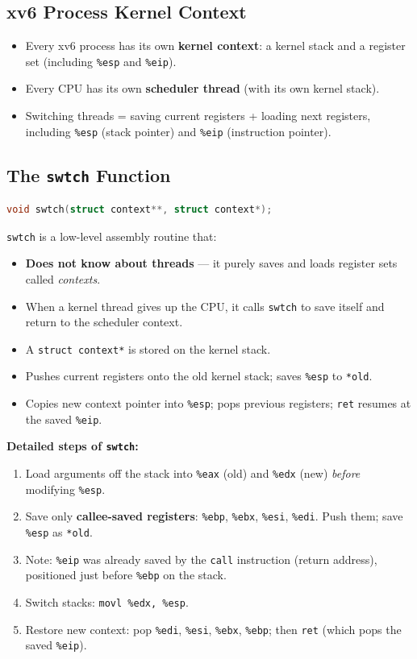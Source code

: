 \documentclass[11pt]{article}
\begin{document}
\subsection{xv6 Process Kernel Context}

\begin{itemize}
    \item Every xv6 process has its own \textbf{kernel context}: a kernel stack and a register set (including \texttt{\%esp} and \texttt{\%eip}).
    \item Every CPU has its own \textbf{scheduler thread} (with its own kernel stack).
    \item Switching threads = saving current registers + loading next registers, including \texttt{\%esp} (stack pointer) and \texttt{\%eip} (instruction pointer).
\end{itemize}

\subsection{The \texttt{swtch} Function}

\begin{lstlisting}[language=C]
void swtch(struct context**, struct context*);
\end{lstlisting}

\texttt{swtch} is a low-level assembly routine that:
\begin{itemize}
    \item \textbf{Does not know about threads} --- it purely saves and loads register sets called \emph{contexts}.
    \item When a kernel thread gives up the CPU, it calls \texttt{swtch} to save itself and return to the scheduler context.
    \item A \texttt{struct context*} is stored on the kernel stack.
    \item Pushes current registers onto the old kernel stack; saves \texttt{\%esp} to \texttt{*old}.
    \item Copies new context pointer into \texttt{\%esp}; pops previous registers; \texttt{ret} resumes at the saved \texttt{\%eip}.
\end{itemize}

\textbf{Detailed steps of \texttt{swtch}:}
\begin{enumerate}
    \item Load arguments off the stack into \texttt{\%eax} (old) and \texttt{\%edx} (new) \emph{before} modifying \texttt{\%esp}.
    \item Save only \textbf{callee-saved registers}: \texttt{\%ebp}, \texttt{\%ebx}, \texttt{\%esi}, \texttt{\%edi}. Push them; save \texttt{\%esp} as \texttt{*old}.
    \item Note: \texttt{\%eip} was already saved by the \texttt{call} instruction (return address), positioned just before \texttt{\%ebp} on the stack.
    \item Switch stacks: \texttt{movl \%edx, \%esp}.
    \item Restore new context: pop \texttt{\%edi}, \texttt{\%esi}, \texttt{\%ebx}, \texttt{\%ebp}; then \texttt{ret} (which pops the saved \texttt{\%eip}).
\end{enumerate}
\end{document}
